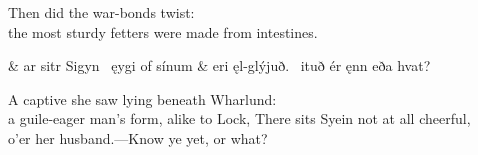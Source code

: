 \bvb Then did  the war-bonds twist: \\
the most sturdy fetters were made from intestines.\evb\evg


\bvg\bva{}%
 &
ar sitr Sigyn \hld\ ęygi of sínum &
eri ęl-glýjuð. \hld\ ituð ér ęnn eða hvat?\eva

\bvb A captive  she saw lying beneath Wharlund: \\
a guile-eager man’s form, alike to Lock,
There sits Syein not at all cheerful, \\
o’er her husband.—Know ye yet, or what?\evb\evg

\sectionline

